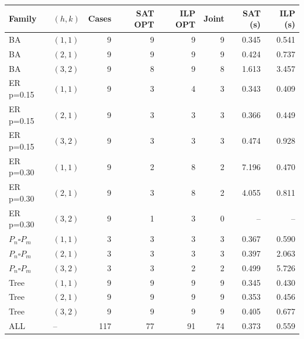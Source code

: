 \begin{tabular}{@{}llrrrrrr@{}}
\toprule
Family & $(h,k)$ & Cases & SAT OPT & ILP OPT & Joint & SAT (s) & ILP (s)\\
\midrule
BA & $(1,1)$ & 9 & 9 & 9 & 9 & 0.345 & 0.541\\
BA & $(2,1)$ & 9 & 9 & 9 & 9 & 0.424 & 0.737\\
BA & $(3,2)$ & 9 & 8 & 9 & 8 & 1.613 & 3.457\\
ER p=0.15 & $(1,1)$ & 9 & 3 & 4 & 3 & 0.343 & 0.409\\
ER p=0.15 & $(2,1)$ & 9 & 3 & 3 & 3 & 0.366 & 0.449\\
ER p=0.15 & $(3,2)$ & 9 & 3 & 3 & 3 & 0.474 & 0.928\\
ER p=0.30 & $(1,1)$ & 9 & 2 & 8 & 2 & 7.196 & 0.470\\
ER p=0.30 & $(2,1)$ & 9 & 3 & 8 & 2 & 4.055 & 0.811\\
ER p=0.30 & $(3,2)$ & 9 & 1 & 3 & 0 & -- & --\\
$P_n\square P_m$ & $(1,1)$ & 3 & 3 & 3 & 3 & 0.367 & 0.590\\
$P_n\square P_m$ & $(2,1)$ & 3 & 3 & 3 & 3 & 0.397 & 2.063\\
$P_n\square P_m$ & $(3,2)$ & 3 & 3 & 2 & 2 & 0.499 & 5.726\\
Tree & $(1,1)$ & 9 & 9 & 9 & 9 & 0.345 & 0.430\\
Tree & $(2,1)$ & 9 & 9 & 9 & 9 & 0.353 & 0.456\\
Tree & $(3,2)$ & 9 & 9 & 9 & 9 & 0.405 & 0.677\\
ALL & -- & 117 & 77 & 91 & 74 & 0.373 & 0.559\\
\bottomrule
\end{tabular}
